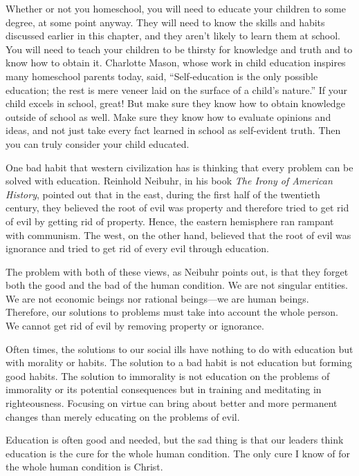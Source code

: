 Whether or not you homeschool, you will need to educate your children
to some degree, at
some point anyway.  They will need to know the skills and habits
discussed earlier in this chapter, and they aren't
likely to learn them at school. You will need to teach your children to
be thirsty for knowledge and truth and to know how to obtain it.
Charlotte Mason, whose work in child education inspires many homeschool
parents today, said, “Self-education is the only possible education;
the rest is mere veneer laid on the surface of a
child's nature.”  If
your child excels in
school, great!  But make sure they know how to obtain knowledge outside
of school as
well. Make sure they
know how to evaluate opinions and ideas, and not just take every fact
learned in school as self-evident truth. Then you can truly consider
your child educated.

\begin{policynote}
One bad habit that western civilization has is thinking that every
problem can be solved with education. Reinhold Neibuhr, in his book
\textit{The Irony of American History}, pointed out that in the east,
during the first half of the twentieth century, they believed the root
of evil was property and therefore tried to get rid of evil by getting
rid of property. Hence, the eastern hemisphere ran rampant with
communism. The west, on the other hand, believed that the root of evil
was ignorance and tried to get rid of every evil through education.

The problem with both of these views, as Neibuhr points out, is that
they forget both the good and the bad of the human condition. We are
not singular entities. We are not economic beings nor rational
beings—we are human beings. Therefore, our solutions to problems must
take into account the whole person.  We cannot get rid of evil by
removing property or ignorance.

Often times, the solutions to our social ills have nothing to do with
education but with morality or habits. The solution to a bad habit is
not education but forming good habits. The solution to immorality is
not education on the problems
of immorality or its
potential consequences but in training and meditating in righteousness.
 Focusing on virtue can bring about better and more permanent changes
than merely educating on the problems of evil.

Education is often good and needed, but the sad thing is that our
leaders think education is the cure for the whole human condition. The
only cure I know of for the whole human condition is Christ.
\end{policynote}

